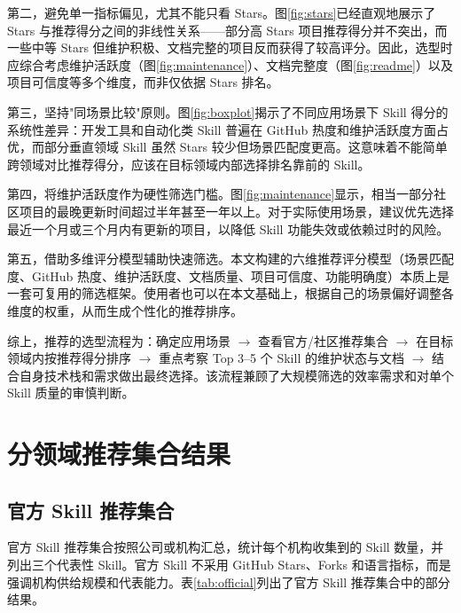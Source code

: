 \documentclass[UTF8,a4paper,12pt]{ctexart}
\begin{document}
第二，避免单一指标偏见，尤其不能只看 Stars。图\ref{fig:stars}已经直观地展示了 Stars 与推荐得分之间的非线性关系——部分高 Stars 项目推荐得分并不突出，而一些中等 Stars 但维护积极、文档完整的项目反而获得了较高评分。因此，选型时应综合考虑维护活跃度（图\ref{fig:maintenance}）、文档完整度（图\ref{fig:readme}）以及项目可信度等多个维度，而非仅依据 Stars 排名。

第三，坚持"同场景比较"原则。图\ref{fig:boxplot}揭示了不同应用场景下 Skill 得分的系统性差异：开发工具和自动化类 Skill 普遍在 GitHub 热度和维护活跃度方面占优，而部分垂直领域 Skill 虽然 Stars 较少但场景匹配度更高。这意味着不能简单跨领域对比推荐得分，应该在目标领域内部选择排名靠前的 Skill。

第四，将维护活跃度作为硬性筛选门槛。图\ref{fig:maintenance}显示，相当一部分社区项目的最晚更新时间超过半年甚至一年以上。对于实际使用场景，建议优先选择最近一个月或三个月内有更新的项目，以降低 Skill 功能失效或依赖过时的风险。

第五，借助多维评分模型辅助快速筛选。本文构建的六维推荐评分模型（场景匹配度、GitHub 热度、维护活跃度、文档质量、项目可信度、功能明确度）本质上是一套可复用的筛选框架。使用者也可以在本文基础上，根据自己的场景偏好调整各维度的权重，从而生成个性化的推荐排序。

综上，推荐的选型流程为：确定应用场景 $\rightarrow$ 查看官方/社区推荐集合 $\rightarrow$ 在目标领域内按推荐得分排序 $\rightarrow$ 重点考察 Top 3--5 个 Skill 的维护状态与文档 $\rightarrow$ 结合自身技术栈和需求做出最终选择。该流程兼顾了大规模筛选的效率需求和对单个 Skill 质量的审慎判断。

\section{分领域推荐集合结果}

\subsection{官方 Skill 推荐集合}

官方 Skill 推荐集合按照公司或机构汇总，统计每个机构收集到的 Skill 数量，并列出三个代表性 Skill。官方 Skill 不采用 GitHub Stars、Forks 和语言指标，而是强调机构供给规模和代表能力。表\ref{tab:official}列出了官方 Skill 推荐集合中的部分结果。
\end{document}
